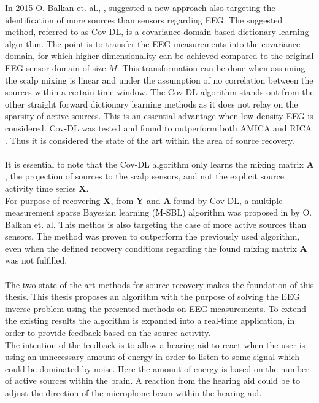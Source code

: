 In 2015 O. Balkan et. al., \cite{Balkan2015}, suggested a new approach also targeting the identification of more sources than sensors regarding EEG. 
The suggested method, referred to as Cov-DL, is a covariance-domain based dictionary learning algorithm. 
The point is to transfer the EEG measurements into the covariance domain, for which higher dimensionality can be achieved compared to the original EEG sensor domain of size $M$. 
This transformation can be done when assuming the scalp mixing is linear and under the assumption of no correlation between the sources within a certain time-window. 
The Cov-DL algorithm stands out from the other straight forward dictionary learning methods as it does not relay on the sparsity of active sources. This is an essential advantage when low-density EEG is considered. 
Cov-DL was tested and found to outperform both AMICA and RICA \cite{Balkan2015}. Thus it is considered the state of the art within the area of source recovery. 
\\ \\
It is essential to note that the Cov-DL algorithm only learns the mixing matrix $\mathbf{A}$, the projection of sources to the scalp sensors, and not the explicit source activity time series $\mathbf{X}$.
\\
For purpose of recovering $\textbf{X}$, from $\textbf{Y}$ and $\textbf{A}$ found by Cov-DL, a multiple measurement sparse Bayesian learning (M-SBL) algorithm was proposed in \cite{Balkan2014} by O. Balkan et. al. This methos is also targeting the case of more active sources than sensors. 
The method was proven to outperform the previously used algorithm, even when the defined recovery conditions regarding the found mixing matrix $\textbf{A}$ was not fulfilled\cite{Balkan2014}.  
\\ \\
The two state of the art methods for source recovery makes the foundation of this thesis. 
This thesis proposes an algorithm with the purpose of solving the EEG inverse problem using the presented methods on EEG measurements. 
To extend the existing results the algorithm is expanded into a real-time application, in order to provide feedback based on the source activity.
\\
The intention of the feedback is to allow a hearing aid to react when the user is using an unnecessary amount of energy in order to listen to some signal which could be dominated by noise. Here the amount of energy is based on the number of active sources within the brain. A reaction from the hearing aid could be to adjust the direction of the microphone beam within the hearing aid.    
